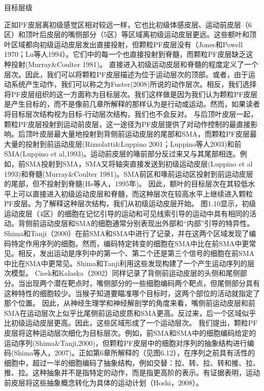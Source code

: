 目标层级

正如PF皮层离初级感觉区相对较远一样，它也比初级体感皮层、运动前皮层（6区）和顶叶后皮层的嘴侧部分（5区）等区域离初级运动皮层更远。这些额叶和顶叶区域都向初级运动皮层发出直接投射，但颗粒PF皮层没有（Jones和Powell 1970；Lu等人1994）。它们中的每一个也直接投射到脊髓，而颗粒PF皮层缺乏这种投射(Murray\&Coulter 1981)。
直接进入初级运动皮层和脊髓的程度定义了一个层次。因此，我们可以将颗粒PF皮层描述为位于运动层次的顶部。或者，由于运动系统产生动作，我们可以称之为Fuster(2008)所说的动作层次。相反，我们选择将PF皮层组织的这一方面称为目标层次。我们这样做是因为我们认为颗粒PF皮层是产生目标的，而不是像前几章所解释的那样认为是行动或运动。然而，如果读者将目标层次结构视为目标-行动层次结构，我们也不会反对。
与后顶叶皮层一起，颗粒PF皮层投射到运动前皮层，这一途径为PF皮层提供了对动作控制的最直接影响。后顶叶皮层最大量地投射到背侧前运动皮层的尾部和SMA，而颗粒PF皮层最大量的投射到前运动皮层(Rizzolatti\&Luppino 2001；Luppino等人2003)和前SMA(Luppino et al,1993)。运动前皮层的喙前部分反过来又与其尾部相连。例如，前SMA投射到SMA，SMA又将轴突直接发送到初级运动皮层(Luppino et al 1993)和脊髓(Murray\&Coulter 1981)。SMA前区和喙前运动区投射到前运动皮层的尾部，但不投射到脊髓(He等人，1995年)。
因此，额叶的目标层次在其较低水平上可以直接进入初级运动皮层和脊髓，而这种层次在较高水平上继续进入颗粒PF皮层。为了解释这种层次结构，我们从初级运动皮层开始。
图1.10显示，初级运动皮层（4区）的细胞在记忆引导的运动和可见线索引导的运动中具有相同的活动。背侧前运动皮层和SMA的细胞通常分别表现出外部和“内部”引导的特异性。
Shima和Tanji（2000）在前SMA和SMA中进行了记录，并在这两个区域发现了编码特定作用序列的细胞。然而，编码特定转变的细胞在SMA中比在前SMA中更常见。相反，发出运动是序列中的第一个、第二个还是第三个信号的细胞在前SMA中比在SMA中更常见。Shima和Tanji利用这些发现构建了一个产生运动序列的层次模型。
Cisek和Kalaska（2002）同样记录了背侧前运动皮层的头侧和尾侧部分。当出现两个潜在靶点时，嘴侧部分的一些细胞编码两个靶点，但尾侧部分具有这种特性的细胞较少。当猴子知道要瞄准哪个目标时，这两个部位的活动就指定了那个位置。
因此，从神经生理学和神经解剖学的角度来看，嘴侧前运动皮层和前SMA在运动层次上似乎比尾侧前运动皮质和SMA更高。反过来，后一个区域似乎比初级运动皮层更高。因此，这些区域形成了一个运动层次。
我们提出，颗粒PF皮层将这种运动层次细化为目标层次。例如，前SMA和SMA中的细胞编码给定的运动序列(Shima\&Tanji,2000)，但颗粒PF皮层中的细胞对序列的抽象结构进行编码(Shima等人，2007)。正如第6章所解释的（见图6.12），在序列之前具有活性的细胞中，超过一半的细胞编码了抽象结构，例如交替：拉、转、拉、转和推、拉、推、拉。这种抽象并不是指特定的动作，而是指更高阶的表示。有证据表明，运动前皮层将这些抽象概念转化为具体的运动计划（Hoshi，2008）。
